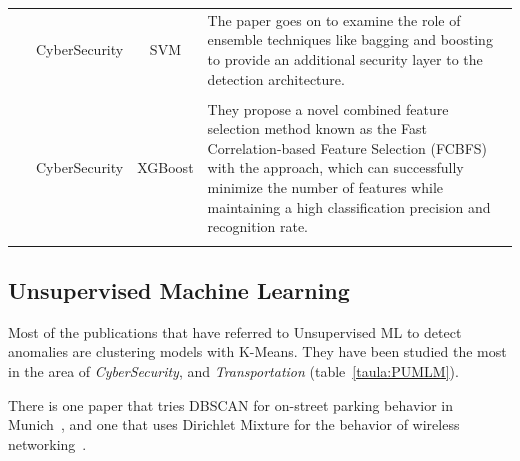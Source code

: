 \documentclass[a4paper,12pt,twoside]{ThesisStyle}
\begin{document}
\begin{landscape}
\begin{longtable}{  l  c  c  l  }
\\
\parbox{1.3cm}{~\cite{bukhari2023anomaly}}  & CyberSecurity & SVM & \parbox{12cm}{ The paper goes on to examine the role of ensemble techniques like bagging and boosting to provide an additional security layer to the detection architecture.} \\
\\
\parbox{1.3cm}{~\cite{yadav2023augmentation}}  & CyberSecurity & XGBoost & \parbox{12cm}{They propose a novel combined feature selection method known as the Fast Correlation-based Feature Selection (FCBFS) with the approach, which can successfully minimize the number of features while maintaining a high classification precision and recognition rate.} \\
\\
\hline
\end{longtable}
\end{landscape}

\subsection{Unsupervised Machine Learning}

Most of the publications that have referred to Unsupervised ML to detect anomalies are clustering models with K-Means. They have been studied the most in the area of \textit{CyberSecurity}, and \textit{Transportation} (table~\ref{taula:PUMLM}). 

There is one paper that tries DBSCAN for on-street parking behavior in Munich~\cite{gomari2021cluster}, and one that uses Dirichlet Mixture for the behavior of wireless networking~\cite{abd2022analyze}.
\end{document}
